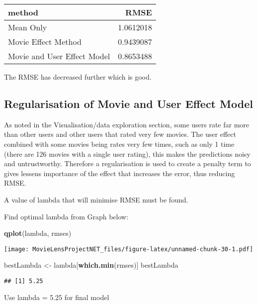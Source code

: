 \documentclass[
]{article}
\newenvironment{Shaded}{\begin{snugshade}}{\end{snugshade}}
\newcommand{\KeywordTok}[1]{\textcolor[rgb]{0.13,0.29,0.53}{\textbf{#1}}}
\newcommand{\NormalTok}[1]{#1}
\newcommand{\StringTok}[1]{\textcolor[rgb]{0.31,0.60,0.02}{#1}}
\begin{document}
\begin{longtable}[]{@{}lr@{}}
\toprule
method & RMSE\tabularnewline
\midrule
\endhead
Mean Only & 1.0612018\tabularnewline
Movie Effect Method & 0.9439087\tabularnewline
Movie and User Effect Model & 0.8653488\tabularnewline
\bottomrule
\end{longtable}

The RMSE has decreased further which is good.

\hypertarget{regularisation-of-movie-and-user-effect-model}{%
\subsection{Regularisation of Movie and User Effect
Model}\label{regularisation-of-movie-and-user-effect-model}}

As noted in the Visualisation/data exploration section, some users rate
far more than other users and other users that rated very few movies.
The user effect combined with some movies being rates very few times,
such as only 1 time (there are 126 movies with a single user rating),
this makes the predictions noisy and untrustworthy. Therefore a
regularisation is used to create a penalty term to gives lessens
importance of the effect that increases the error, thus reducing RMSE.

A value of lambda that will minimise RMSE must be found.

Find optimal lambda from Graph below:

\begin{Shaded}
\begin{Highlighting}[]
\KeywordTok{qplot}\NormalTok{(lambda, rmses)}
\end{Highlighting}
\end{Shaded}

\texttt{[image: MovieLensProjectNET\_files/figure-latex/unnamed-chunk-30-1.pdf]}

\begin{Shaded}
\begin{Highlighting}[]
\NormalTok{bestLambda <-}\StringTok{ }\NormalTok{lambda[}\KeywordTok{which.min}\NormalTok{(rmses)]}
\NormalTok{bestLambda}
\end{Highlighting}
\end{Shaded}

\begin{verbatim}
## [1] 5.25
\end{verbatim}

Use lambda = 5.25 for final model
\end{document}
